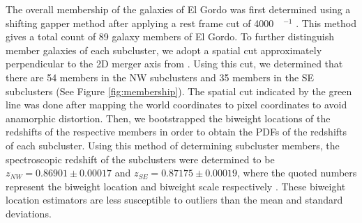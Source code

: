 
The overall membership of the galaxies
of El Gordo was first determined using a shifting gapper method
\citep{Fadda96} after applying a rest frame cut of
4000~\kilo\meter~\second$^{-1}$ \citep{Sifon13}. This method gives a
total count of 89 galaxy members of El Gordo.
To further distinguish member galaxies of each subcluster, we adopt a spatial cut approximately perpendicular to the 2D merger axis
from . Using this cut, we determined that there are 54
members in the NW subclusters and 35 members in the SE subclusters (See Figure
\ref{fig:membership}). The spatial cut indicated by the green line was done after
mapping the world coordinates to pixel coordinates to avoid anamorphic distortion. 
Then, we bootstrapped the biweight locations of the redshifts of the
respective members in order to obtain the PDFs of the redshifts of each
subcluster. 
\citep{Sifon13} Using this method of determining subcluster members, the spectroscopic
redshift of the subclusters were determined to be $z_{NW} = 0.86901 \pm
0.00017$ and $z_{SE} = 0.87175 \pm 0.00019$, where the quoted numbers represent the biweight location and
biweight scale respectively \citep{Beers90}. 
These biweight location
estimators are less susceptible to outliers than the mean and standard
deviations. 

%
